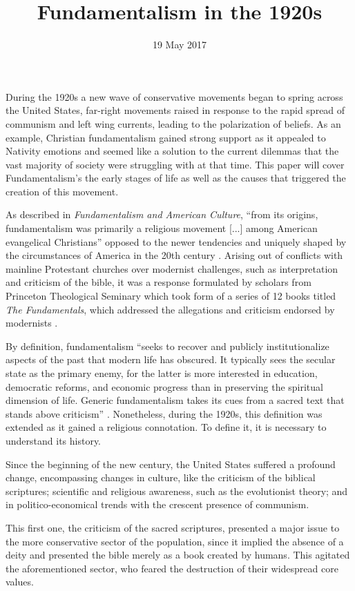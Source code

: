 \documentclass{article}
\title{Fundamentalism in the 1920s}
\date{19 May 2017}
\begin{document}
  \makeheader
  
  During the 1920s a new wave of conservative movements began to spring across the United States, far-right movements raised in response to the rapid spread of communism and left wing currents, leading to the polarization of beliefs. As an example, Christian fundamentalism gained strong support as it appealed to Nativity emotions and seemed like a solution to the current dilemmas that the vast majority of society were struggling with at that time. This paper will cover Fundamentalism's the early stages of life as well as the causes that triggered the creation of this movement.
  
  As described in \textit{Fundamentalism and American Culture}, ``from its origins, fundamentalism was primarily a religious movement [...] among American evangelical Christians'' \cite[4]{fundamentalism1} opposed to the newer tendencies and uniquely shaped by the circumstances of America in the 20th century \cite[6]{fundamentalism1}. Arising out of conflicts with mainline Protestant churches over modernist challenges, such as interpretation and criticism of the bible, it was a response formulated by scholars from Princeton Theological Seminary which took form of a series of 12 books titled \textit{The Fundamentals}, which addressed the allegations and criticism endorsed by modernists \cite{ChristianFundamentalism}.
   
  By definition, fundamentalism ``seeks to recover and publicly institutionalize aspects of the past that modern life has obscured. It typically sees the secular state as the primary enemy, for the latter is more interested in education, democratic reforms, and economic progress than in preserving the spiritual dimension of life. Generic fundamentalism takes its cues from a sacred text that stands above criticism'' \cite{RiseFundamentalism}. Nonetheless, during the 1920s, this definition was extended as it gained a religious connotation. To define it, it is necessary to understand its history.
  
  Since the beginning of the new century, the United States suffered a profound change, encompassing changes in culture, like the criticism of the biblical scriptures; scientific and religious awareness, such as the evolutionist theory; and in politico-economical trends with the crescent presence of communism.
  
  This first one, the criticism of the sacred scriptures, presented a major issue to the more conservative sector of the population, since it implied the absence of a deity and presented the bible merely as a book created by humans. This agitated the aforementioned sector, who feared the destruction of their widespread core values.
  
\end{document}
